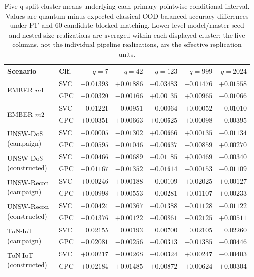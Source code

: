 \documentclass[11pt]{article}
\begin{document}
\begin{table}[p]
\centering
\caption{Five q-split cluster means underlying each primary pointwise
conditional interval. Values are quantum-minus-expected-classical OOD
balanced-accuracy differences under P1$'$ and 60-candidate blocked matching.
Lower-level model/master-seed and nested-size realizations are averaged within
each displayed cluster; the five columns, not the individual pipeline
realizations, are the effective replication units.}
\label{supp:tab_cluster_values}
\scriptsize
\setlength{\tabcolsep}{3.4pt}
\begin{tabular}{llrrrrr}
\toprule
Scenario & Clf. & $q=7$ & $q=42$ & $q=123$ & $q=999$ & $q=2024$ \\
\midrule
\multirow{2}{*}{EMBER $m1$}
 & SVC & $-0.01393$ & $+0.01886$ & $-0.03483$ & $-0.01476$ & $+0.01558$ \\
 & GPC & $-0.00320$ & $-0.00166$ & $+0.00135$ & $+0.00965$ & $-0.01066$ \\
\multirow{2}{*}{EMBER $m2$}
 & SVC & $-0.01221$ & $-0.00951$ & $-0.00064$ & $+0.00052$ & $-0.01010$ \\
 & GPC & $+0.00351$ & $+0.00663$ & $+0.00625$ & $+0.00098$ & $-0.00395$ \\
\multirow{2}{*}{UNSW-DoS (campaign)}
 & SVC & $-0.00005$ & $-0.01302$ & $+0.00666$ & $+0.00135$ & $-0.01134$ \\
 & GPC & $-0.00595$ & $-0.01046$ & $-0.00637$ & $-0.00859$ & $+0.00270$ \\
\multirow{2}{*}{UNSW-DoS (constructed)}
 & SVC & $-0.00466$ & $-0.00689$ & $-0.01185$ & $+0.00469$ & $-0.00340$ \\
 & GPC & $-0.01167$ & $-0.01352$ & $-0.01614$ & $-0.00153$ & $-0.01109$ \\
\multirow{2}{*}{UNSW-Recon (campaign)}
 & SVC & $+0.00246$ & $+0.00188$ & $-0.00109$ & $+0.02025$ & $+0.00127$ \\
 & GPC & $+0.00998$ & $+0.00553$ & $-0.00281$ & $+0.01107$ & $+0.00233$ \\
\multirow{2}{*}{UNSW-Recon (constructed)}
 & SVC & $-0.00424$ & $-0.00367$ & $-0.01388$ & $-0.01128$ & $-0.01122$ \\
 & GPC & $-0.01376$ & $+0.00122$ & $-0.00861$ & $-0.02125$ & $+0.00511$ \\
\multirow{2}{*}{ToN-IoT (campaign)}
 & SVC & $-0.02155$ & $-0.00193$ & $-0.00700$ & $-0.02105$ & $-0.02260$ \\
 & GPC & $-0.02081$ & $-0.00256$ & $-0.00313$ & $-0.01385$ & $-0.00446$ \\
\multirow{2}{*}{ToN-IoT (constructed)}
 & SVC & $+0.00217$ & $-0.00268$ & $-0.00324$ & $+0.00247$ & $-0.00403$ \\
 & GPC & $+0.02184$ & $+0.01485$ & $+0.00872$ & $+0.00624$ & $+0.00304$ \\
\bottomrule
\end{tabular}
\end{table}
\end{document}
